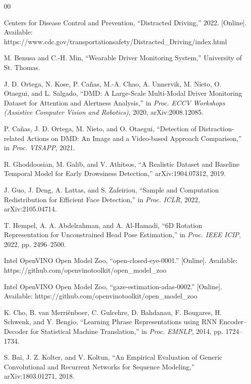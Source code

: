 \documentclass[conference]{IEEEtran}
\begin{document}
\begin{thebibliography}{00}

 Centers for Disease Control and Prevention, ``Distracted Driving,'' 2022. [Online]. Available: https://www.cdc.gov/transportationsafety/Distracted\_Driving/index.html

 M. Benusa and C.-H. Min, ``Wearable Driver Monitoring System,'' University of St. Thomas.

 J. D. Ortega, N. Kose, P. Ca\~nas, M.-A. Chao, A. Unnervik, M. Nieto, O. Otaegui, and L. Salgado, ``DMD: A Large-Scale Multi-Modal Driver Monitoring Dataset for Attention and Alertness Analysis,'' in \emph{Proc. ECCV Workshops (Assistive Computer Vision and Robotics)}, 2020, arXiv:2008.12085.

 P. Ca\~nas, J. D. Ortega, M. Nieto, and O. Otaegui, ``Detection of Distraction-related Actions on DMD: An Image and a Video-based Approach Comparison,'' in \emph{Proc. VISAPP}, 2021. %

 R. Ghoddoosian, M. Galib, and V. Athitsos, ``A Realistic Dataset and Baseline Temporal Model for Early Drowsiness Detection,'' arXiv:1904.07312, 2019.

 J. Guo, J. Deng, A. Lattas, and S. Zafeiriou, ``Sample and Computation Redistribution for Efficient Face Detection,'' in \emph{Proc. ICLR}, 2022, arXiv:2105.04714.

 T. Hempel, A. A. Abdelrahman, and A. Al-Hamadi, ``6D Rotation Representation for Unconstrained Head Pose Estimation,'' in \emph{Proc. IEEE ICIP}, 2022, pp. 2496--2500.

 Intel OpenVINO Open Model Zoo, ``open-closed-eye-0001.'' [Online]. Available: https://github.com/openvinotoolkit/open\_model\_zoo

 Intel OpenVINO Open Model Zoo, ``gaze-estimation-adas-0002.'' [Online]. Available: https://github.com/openvinotoolkit/open\_model\_zoo

 K. Cho, B. van Merri\"enboer, C. Gulcehre, D. Bahdanau, F. Bougares, H. Schwenk, and Y. Bengio, ``Learning Phrase Representations using RNN Encoder--Decoder for Statistical Machine Translation,'' in \emph{Proc. EMNLP}, 2014, pp. 1724--1734.

 S. Bai, J. Z. Kolter, and V. Koltun, ``An Empirical Evaluation of Generic Convolutional and Recurrent Networks for Sequence Modeling,'' arXiv:1803.01271, 2018.


\end{thebibliography}
\end{document}
